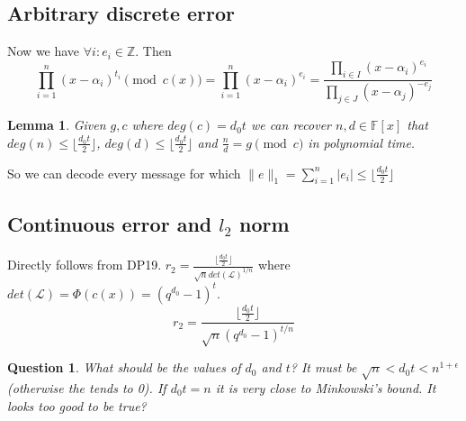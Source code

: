 \documentclass[12pt]{article}
\newcommand{\floor}[1]{\lfloor #1 \rfloor}
\newtheorem{question}{Question}
\newtheorem{lemma}{Lemma}
\begin{document}
\subsection{Arbitrary discrete error}
Now we have $\forall i: e_i \in \mathbb{Z}$. Then
\begin{equation}
\prod_{i = 1}^{n}(x - \alpha_i)^{t_i} \pmod{c(x)} = \prod_{i = 1}^{n}(x - \alpha_i)^{e_i} = \frac{\prod_{i \in I}(x - \alpha_i)^{e_i}}{\prod_{j \in J}(x - \alpha_j)^{-e_j}}
\end{equation}
\begin{lemma}
Given $g,c$ where $deg(c) = d_0t$ we can recover $n, d \in \mathbb{F}[x]$ that $deg(n) \leq \floor{\frac{d_0t}{2}}$, $deg(d) \leq \floor{\frac{d_0t}{2}}$ and $\frac{n}{d} = g \pmod{c}$ in polynomial time.
\end{lemma}
So we can decode every message for which $\|e\|_1 = \sum_{i =1}^{n} |e_i| \leq \floor{\frac{d_0t}{2}}$

\subsection{Continuous error and $l_2$ norm}
Directly follows from DP19. $r_2 = \frac{\floor{\frac{d_0t}{2}}}{\sqrt{n} det(\mathcal{L})^{1/n}}$ where $det(\mathcal{L}) = \Phi(c(x)) = (q^{d_0} - 1)^{t}$.
\begin{equation}
r_2 = \frac{\floor{\frac{d_0t}{2}}}{\sqrt{n} (q^{d_0} - 1)^{t/n}}
\end{equation}
\begin{question}
What should be the values of $d_0$ and $t$? It must be $\sqrt{n} < d_0t < n^{1+\epsilon}$(otherwise the tends to 0). If $d_0t = n$ it is very close to Minkowski's bound. It looks too good to be true? 
\end{question}
\end{document}
